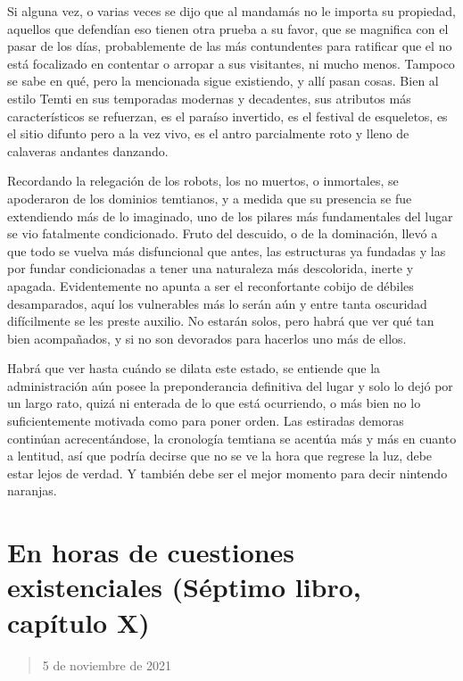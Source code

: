 \documentclass[
]{book}
\begin{document}
Si alguna vez, o varias veces se dijo que al mandamás no le importa su propiedad, aquellos que defendían eso tienen otra prueba a su favor, que se magnifica con el pasar de los días, probablemente de las más contundentes para ratificar que el no está focalizado en contentar o arropar a sus visitantes, ni mucho menos. Tampoco se sabe en qué, pero la mencionada sigue existiendo, y allí pasan cosas. Bien al estilo Temti en sus temporadas modernas y decadentes, sus atributos más característicos se refuerzan, es el paraíso invertido, es el festival de esqueletos, es el sitio difunto pero a la vez vivo, es el antro parcialmente roto y lleno de calaveras andantes danzando.

Recordando la relegación de los robots, los no muertos, o inmortales, se apoderaron de los dominios temtianos, y a medida que su presencia se fue extendiendo más de lo imaginado, uno de los pilares más fundamentales del lugar se vio fatalmente condicionado. Fruto del descuido, o de la dominación, llevó a que todo se vuelva más disfuncional que antes, las estructuras ya fundadas y las por fundar condicionadas a tener una naturaleza más descolorida, inerte y apagada. Evidentemente no apunta a ser el reconfortante cobijo de débiles desamparados, aquí los vulnerables más lo serán aún y entre tanta oscuridad difícilmente se les preste auxilio. No estarán solos, pero habrá que ver qué tan bien acompañados, y si no son devorados para hacerlos uno más de ellos.

Habrá que ver hasta cuándo se dilata este estado, se entiende que la administración aún posee la preponderancia definitiva del lugar y solo lo dejó por un largo rato, quizá ni enterada de lo que está ocurriendo, o más bien no lo suficientemente motivada como para poner orden. Las estiradas demoras continúan acrecentándose, la cronología temtiana se acentúa más y más en cuanto a lentitud, así que podría decirse que no se ve la hora que regrese la luz, debe estar lejos de verdad. Y también debe ser el mejor momento para decir nintendo naranjas.

\hypertarget{en-horas-de-cuestiones-existenciales-suxe9ptimo-libro-capuxedtulo-x}{%
\section{En horas de cuestiones existenciales (Séptimo libro, capítulo X)}\label{en-horas-de-cuestiones-existenciales-suxe9ptimo-libro-capuxedtulo-x}}

\begin{quote}
5 de noviembre de 2021
\end{quote}
\end{document}
